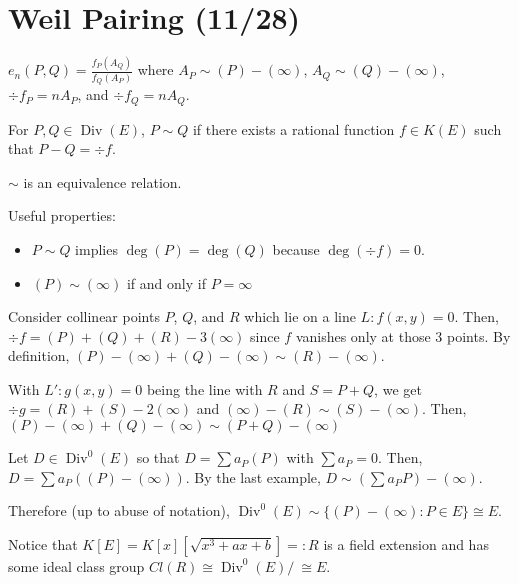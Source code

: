 \documentclass[notes]{agony}
\newcommand{\Div}{\operatorname{Div}}
\begin{document}
\section{Weil Pairing (11/28)}

\begin{defn}
  $e_n(P,Q) = \frac{f_P(A_Q)}{f_Q(A_P)}$
  where $A_P \sim (P) - (\infty)$,
  $A_Q \sim (Q) - (\infty)$,
  $\div f_P = nA_P$, and $\div f_Q = nA_Q$.
\end{defn}

\begin{defn}[equivalence]
  For $P, Q \in \Div(E)$, $P \sim Q$
  if there exists a rational function $f \in K(E)$ such that $P-Q = \div f$.
\end{defn}
\begin{lemma}
  $\sim$ is an equivalence relation.
\end{lemma}

Useful properties:
\begin{itemize}[nosep]
  \item $P \sim Q$ implies $\deg(P) = \deg(Q)$ because $\deg(\div f) = 0$.
  \item $(P) \sim (\infty)$ if and only if $P = \infty$
\end{itemize}

\begin{example}
  Consider collinear points $P$, $Q$, and $R$
  which lie on a line $L : f(x,y) = 0$.
  Then, $\div f = (P) + (Q) + (R) - 3(\infty)$
  since $f$ vanishes only at those 3 points.
  By definition, $(P) - (\infty) + (Q) - (\infty) \sim (R) - (\infty)$.

  With $L' : g(x,y)=0$ being the line with $R$ and $S = P+Q$,
  we get $\div g = (R) + (S) - 2(\infty)$
  and $(\infty)-(R) \sim (S)-(\infty)$.
  Then, $(P) - (\infty) + (Q) - (\infty) \sim (P+Q) - (\infty)$
\end{example}

\begin{example}
  Let $D \in \Div^0(E)$
  so that $D = \sum a_P(P)$ with $\sum a_P = 0$.
  Then, $D = \sum a_P((P) - (\infty))$.
  By the last example, $D \sim (\sum a_P P) - (\infty)$.
\end{example}

Therefore (up to abuse of notation),
$\Div^0(E) \sim \{ (P) - (\infty) : P \in E \} \cong E$.

Notice that $K[E] = K[x][\sqrt{x^3+ax+b}] =: R$ is a field extension and
has some ideal class group $Cl(R) \cong \Div^0(E)/~ \cong E$.
\end{document}
